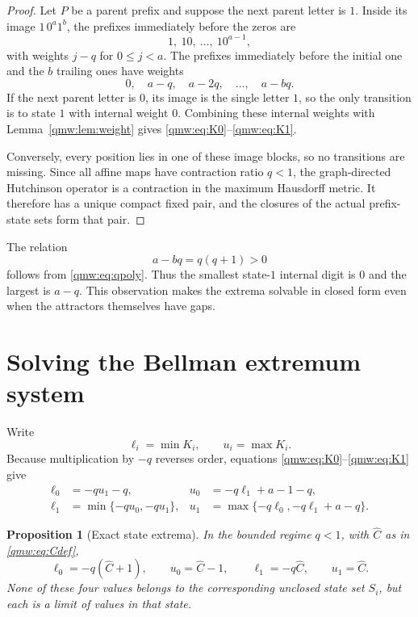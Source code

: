 \documentclass[11pt]{article}
\numberwithin{equation}{section}
\newtheorem{proposition}[theorem]{Proposition}
\theoremstyle{definition}
\theoremstyle{remark}
\begin{document}
\begin{proof}
Let $P$ be a parent prefix and suppose the next parent letter is $1$.
Inside its image $1\,0^a1^b$, the prefixes immediately before the zeros are
\[
1,\ 10,\ \ldots,\ 10^{a-1},
\]
with weights $j-q$ for $0\leq j<a$.  The prefixes immediately before the
initial one and the $b$ trailing ones have weights
\[
0,\quad a-q,\quad a-2q,\quad\ldots,\quad a-bq.
\]
If the next parent letter is $0$, its image is the single letter $1$, so the
only transition is to state $1$ with internal weight $0$.  Combining these
internal weights with Lemma~\ref{qmw:lem:weight} gives
\eqref{qmw:eq:K0}--\eqref{qmw:eq:K1}.

Conversely, every position lies in one of these image blocks, so no
transitions are missing.  Since all affine maps have contraction ratio $q<1$,
the graph-directed Hutchinson operator is a contraction in the maximum
Hausdorff metric.  It therefore has a unique compact fixed pair, and the
closures of the actual prefix-state sets form that pair.
\end{proof}

The relation
\begin{equation}\label{qmw:eq:min-digit}
a-bq=q(q+1)>0
\end{equation}
follows from \eqref{qmw:eq:qpoly}.  Thus the smallest state-$1$ internal digit is
$0$ and the largest is $a-q$.  This observation makes the extrema solvable in
closed form even when the attractors themselves have gaps.

\section{Solving the Bellman extremum system}\label{qmw:sec:extrema}

Write
\[
\ell_i=\min K_i,
\qquad
u_i=\max K_i.
\]
Because multiplication by $-q$ reverses order, equations
\eqref{qmw:eq:K0}--\eqref{qmw:eq:K1} give
\begin{align}
\ell_0&=-qu_1-q,
&u_0&=-q\ell_1+a-1-q,
\label{qmw:eq:bellman0}\\
\ell_1&=\min\{-qu_0,-qu_1\},
&u_1&=\max\{-q\ell_0,-q\ell_1+a-q\}.
\label{qmw:eq:bellman1}
\end{align}

\begin{proposition}[Exact state extrema]\label{qmw:prop:extrema}
In the bounded regime $q<1$, with ${\widehat C}$ as in \eqref{qmw:eq:Cdef},
\begin{equation}\label{qmw:eq:state-extrema}
\boxed{
\ell_0=-q({\widehat C}+1),\qquad
u_0={\widehat C}-1,
\qquad
\ell_1=-q{\widehat C},
\qquad
u_1={\widehat C}.}
\end{equation}
None of these four values belongs to the corresponding unclosed state set
$S_i$, but each is a limit of values in that state.
\end{proposition}
\end{document}
